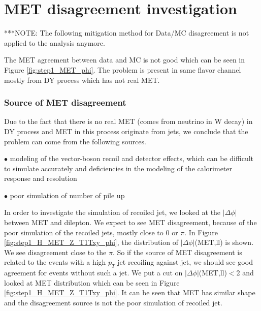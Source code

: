 \clearpage
\section{MET disagreement investigation}
\label{MET_disagreement_investigation}

***NOTE: The following mitigation method for Data/MC disagreement is not applied to the analysis anymore.

The MET agreement between data and MC is not good which can be seen in
Figure \ref{fig:step1_MET_phi}.
The problem is present in same flavor channel mostly from DY process which has not real MET.

\subsubsection {Source of MET disagreement}
Due to the fact that there is no real MET (comes from neutrino in W decay) in DY process and MET in this process originate from jets, we conclude that the problem can come from the following sources.

$\bullet$ modeling of the vector-boson recoil and detector effects, which can be difficult to simulate accurately and deficiencies in the modeling of the calorimeter response and resolution \cite{recoil}

$\bullet$ poor simulation of number of pile up

In order to investigate the simulation of recoiled jet, we looked at the  $|\Delta \phi|$ between MET and dilepton.
We expect to see MET disagreement, because of the poor simulation of the recoiled jets, mostly  close to 0 or $\pi$.
In Figure \ref{fig:step1_H_MET_Z_T1Txy_phi}, the distribution of $|\Delta \phi|$(MET,ll) is shown. We see disagreement close to the $\pi$.
So if the source of MET disagreement is related to the events with a high $p_T$ jet recoiling against jet, we should see good agreement for events without such a jet.
We put a cut on $|\Delta \phi|$(MET,ll)$<$2 and looked at MET distribution which can be seen in Figure \ref{fig:step1_H_MET_Z_T1Txy_phi}.
It can be seen that MET has similar shape and the disagreement source is not the poor simulation of recoiled jet.


